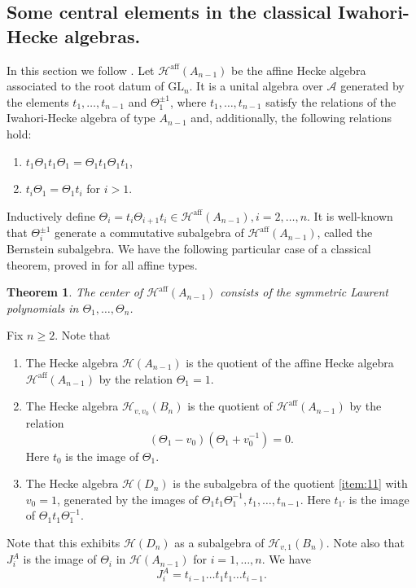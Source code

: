 \documentclass[11pt,leqno]{article}
\newtheorem{theorem}{Theorem}[subsection]
\theoremstyle{definition}
\theoremstyle{definition}
\theoremstyle{remark}
\newcommand{\He}{\mathcal{H}}
\newcommand{\aff}{\mathrm{aff}}
\begin{document}
\subsection{Some central elements in the classical Iwahori-Hecke algebras.}
\label{sec:some-centr-elem}
In this section we follow \cite{Ram2003}.
Let $\He^{\aff}(A_{n-1})$ be the affine Hecke algebra associated to the root datum of $\mathrm{GL}_n$. It is a unital algebra over $\mathcal{A}$ generated by the elements $t_1, \dots, t_{n-1}$ and $\Theta_1^{\pm 1}$, where $t_1, \dots, t_{n-1}$ satisfy the relations of the Iwahori-Hecke algebra of type $A_{n-1}$ and, additionally, the following relations hold:
\begin{enumerate}
\item[(iii).] $t_1\Theta_1 t_1\Theta_1 = \Theta_1 t_1 \Theta_1 t_1$,
\item[(iv).] $t_i\Theta_1 = \Theta_1 t_i$ for $i > 1$.
\end{enumerate}
Inductively define $\Theta_i = t_i\Theta_{i+1}t_i \in \He^{\aff}(A_{n-1}), i = 2, \dots, n$. It is well-known that $\Theta_i^{\pm 1}$ generate a commutative subalgebra of $\He^{\aff}(A_{n-1})$, called the Bernstein subalgebra. We have the following particular case of a classical theorem, proved in \cite[Theorem 8.1]{lusztigSingularitiesCharacterFormulas1983} for all affine types.  
\begin{theorem}
 The center of $\He^{\aff}(A_{n-1})$ consists of the symmetric Laurent polynomials in $\Theta_1, \dots, \Theta_{n}$. 
\end{theorem}

Fix $n \geq 2$. Note that
\begin{enumerate}[label=(\roman*).,ref=(\roman*)]
\item The Hecke algebra $\He(A_{n-1})$ is the quotient of the affine Hecke algebra $\He^{\aff}(A_{n-1})$ by the relation $\Theta_1 = 1$.
\item\label{item:11} The Hecke algebra $\He_{v,v_0}(B_n)$ is the quotient of $\He^{\aff}(A_{n-1})$ by the relation \[(\Theta_1 - v_0)(\Theta_1 + v_0^{-1}) = 0.\] Here $t_0$ is the image of $\Theta_1$.
\item The Hecke algebra $\He(D_n)$ is the subalgebra of the quotient \ref{item:11} with $v_0 = 1$,  ge\-ne\-ra\-ted by the images of $\Theta_1 t_1 \Theta_1^{-1}, t_1, \dots, t_{n-1}$. Here $t_{1'}$ is the image of $\Theta_1 t_1 \Theta_1^{-1}$.
\end{enumerate}
Note that this exhibits $\He(D_n)$ as a subalgebra of $\He_{v,1}(B_n)$.
Note also that $J^A_i$ is the image of $\Theta_i$ in $\He(A_{n-1})$ for $i = 1, \dots, n$. We have \[J^A_{i} = t_{i-1}\dots t_1t_1 \dots t_{i-1}.\]
\end{document}
